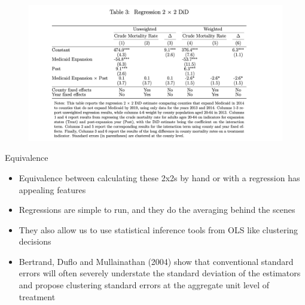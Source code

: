 \documentclass{beamer}
\begin{document}
\begin{frame}

\begin{figure}
    \centering
    \includegraphics[height=0.7\textheight]{./lecture_includes/regression2x2.png}
\end{figure}

\end{frame}

\begin{frame}{Equivalence}

\begin{itemize}

\item Equivalence between calculating these 2x2s by hand or with a regression has appealing features
\item Regressions are simple to run, and they do the averaging behind the scenes
\item They also allow us to use statistical inference tools from OLS like clustering decisions
\item  Bertrand, Duflo and Mullainathan (2004) show that conventional standard errors will often severely understate the standard deviation of the estimators and propose clustering standard errors at the aggregate unit level of treatment
\end{itemize}

\end{frame}
\end{document}
